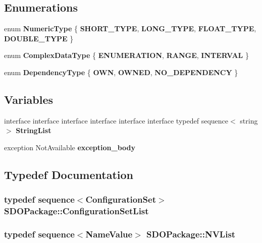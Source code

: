 \subsection*{Enumerations}
\begin{CompactItemize}
\item 
enum {\bf Numeric\-Type} \{ {\bf SHORT\_\-TYPE}, 
{\bf LONG\_\-TYPE}, 
{\bf FLOAT\_\-TYPE}, 
{\bf DOUBLE\_\-TYPE}
 \}
\item 
enum {\bf Complex\-Data\-Type} \{ {\bf ENUMERATION}, 
{\bf RANGE}, 
{\bf INTERVAL}
 \}
\item 
enum {\bf Dependency\-Type} \{ {\bf OWN}, 
{\bf OWNED}, 
{\bf NO\_\-DEPENDENCY}
 \}
\end{CompactItemize}
\subsection*{Variables}
\begin{CompactItemize}
\item 
interface interface interface interface interface interface typedef sequence$<$ string $>$ {\bf String\-List}
\item 
exception Not\-Available {\bf exception\_\-body}
\end{CompactItemize}


\subsection{Typedef Documentation}
\subsubsection{\setlength{\rightskip}{0pt plus 5cm}typedef sequence$<${\bf Configuration\-Set}$>$ {\bf SDOPackage::Configuration\-Set\-List}}\label{namespaceSDOPackage_a7}


\subsubsection{\setlength{\rightskip}{0pt plus 5cm}typedef sequence$<${\bf Name\-Value}$>$ {\bf SDOPackage::NVList}}\label{namespaceSDOPackage_a4}


